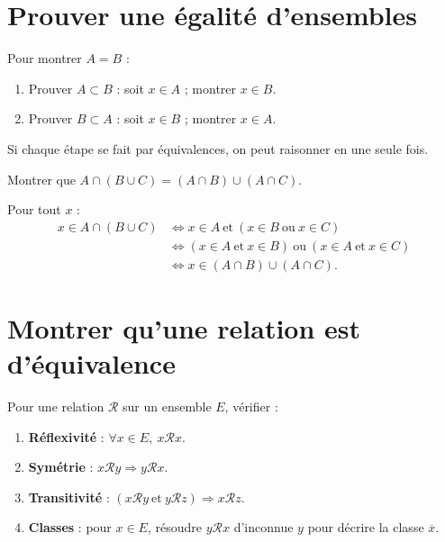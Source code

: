 
\section{Prouver une égalité d'ensembles}

\begin{methode}
Pour montrer $A=B$ :
\begin{enumerate}[label=\textbf{Étape \arabic*.}]
  \item Prouver $A\subset B$ : soit $x\in A$ ; montrer $x\in B$.
  \item Prouver $B\subset A$ : soit $x\in B$ ; montrer $x\in A$.
\end{enumerate}
Si chaque étape se fait par équivalences, on peut raisonner en une seule fois.
\end{methode}

\begin{exemple}
Montrer que $A\cap(B\cup C)=(A\cap B)\cup(A\cap C)$.

Pour tout $x$ :
\begin{align*}
x\in A\cap(B\cup C)
&\iff x\in A\ \text{et}\ (x\in B\ \text{ou}\ x\in C)\\
&\iff (x\in A\ \text{et}\ x\in B)\ \text{ou}\ (x\in A\ \text{et}\ x\in C)\\
&\iff x\in(A\cap B)\cup(A\cap C).
\end{align*}
\end{exemple}

\section{Montrer qu'une relation est d'équivalence}

\begin{methode}
Pour une relation $\mathcal R$ sur un ensemble $E$, vérifier :
\begin{enumerate}[label=\textbf{Étape \arabic*.}]
  \item \textbf{Réflexivité} : $\forall x\in E,\ x\mathcal Rx$.
  \item \textbf{Symétrie} : $x\mathcal Ry\Rightarrow y\mathcal Rx$.
  \item \textbf{Transitivité} : $(x\mathcal Ry\ \text{et}\ y\mathcal Rz)\Rightarrow x\mathcal Rz$.
  \item \textbf{Classes} : pour $x\in E$, résoudre $y\mathcal Rx$ d'inconnue $y$ pour décrire la classe $\overline{x}$.
\end{enumerate}
\end{methode}

